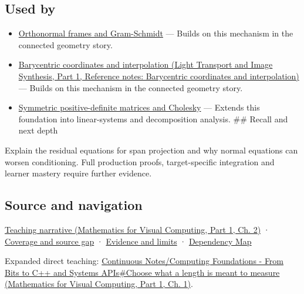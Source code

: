 \subsection{Used by}\label{appendix-3b863809f82a-used-by}

\hypertarget{appendix-3b863809f82a-used-by}{}

\begin{itemize}
\tightlist
\item
  \hyperref[appendix-c39f1ed34271]{Orthonormal frames and Gram-Schmidt} --- Builds on this mechanism in the connected geometry story.
\item
  \href{../04-Light-Transport-and-Image-Synthesis-P01/main.pdf\#nameddest=appendix-02b9d9a81dca}{Barycentric coordinates and interpolation (Light Transport and Image Synthesis, Part 1, Reference notes: Barycentric coordinates and interpolation)} --- Builds on this mechanism in the connected geometry story.
\item
  \hyperref[appendix-50d2ea3c9b26]{Symmetric positive-definite matrices and Cholesky} --- Extends this foundation into linear-systems and decomposition analysis. \#\# Recall and next depth
\end{itemize}

Explain the residual equations for span projection and why normal equations can worsen conditioning. Full production proofs, target-specific integration and learner mastery require further evidence.

\subsection{Source and navigation}\label{appendix-3b863809f82a-source-and-navigation}

\hypertarget{appendix-3b863809f82a-source-and-navigation}{}

\href{../02-Mathematics-for-Visual-Computing-P01/main.pdf\#nameddest=01-foundations-i-ch018-a-gram-matrix-remembers-the-geometry-of-a-slanted-basis}{Teaching narrative (Mathematics for Visual Computing, Part 1, Ch. 2)} · \hyperref[appendix-fd090d982a15-phase-6---parts-501-600]{Coverage and source gap} · \hyperref[appendix-a103e7846d21-phase-6---source-analysis-and-verification]{Evidence and limits} · \hyperref[appendix-4ad47bdd269a]{Dependency Map}

Expanded direct teaching: \href{../02-Mathematics-for-Visual-Computing-P01/main.pdf\#nameddest=01-foundations-i-ch017-choose-what-a-length-is-meant-to-measure}{Continuous Notes/Computing Foundations - From Bits to C++ and Systems APIs\#Choose what a length is meant to measure (Mathematics for Visual Computing, Part 1, Ch. 1)}.

